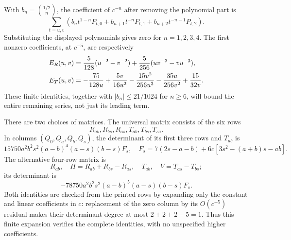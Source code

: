 \documentclass[12pt]{article}
\numberwithin{equation}{section}
\begin{document}
With $b_n=\binom{1/2}{n}$, the coefficient of $c^{-n}$ after removing
the polynomial part is
\begin{equation}\label{eq:ff-pcancel}
 \sum_{t=u,v}\left(b_nt^{1-n}P_{t,0}
       +b_{n+1}t^{-n}P_{t,1}+b_{n+2}t^{-n-1}P_{t,2}\right).
\end{equation}
Substituting the displayed polynomials gives zero for $n=1,2,3,4$.
The first nonzero coefficients, at $c^{-5}$, are respectively
\begin{align}
 E_R(u,v)&=\frac5{128}(u^{-2}-v^{-2})
              +\frac5{256}(uv^{-3}-vu^{-3}),\label{eq:ff-leading}\\
 E_T(u,v)&=-\frac{75}{128u}+\frac{5v}{16u^2}
 -\frac{15v^2}{256u^3}-\frac{35u}{256v^2}+\frac{15}{32v}.\notag
\end{align}
These finite identities, together with $|b_n|\le21/1024$ for $n\ge6$,
will bound the entire remaining series, not just its leading term.

There are two choices of matrices. The universal matrix consists of
the six rows
\begin{equation}\label{eq:ff-p0rows}
 R_{ab},R_{bs},R_{as},T_{ab},T_{bs},T_{sa}.
\end{equation}
In columns $(Q_0,Q_a,Q_b,Q_s)$, the determinant of its first three
rows and $T_{ab}$ is
\begin{equation}\label{eq:ff-p0det}
 15750a^2b^2s^2(a-b)^4(a-s)(b-s)F_s,
 \quad F_s=7(2s-a-b)+6c[3s^2-(a+b)s-ab].
\end{equation}
The alternative four-row matrix is
\begin{equation}\label{eq:ff-prows}
 R_{ab},\quad H=R_{ab}+R_{bs}-R_{as},\quad
 T_{ab},\quad V=T_{as}-T_{bs};
\end{equation}
its determinant is
\begin{equation}\label{eq:ff-pdet}
 -78750a^2b^2s^2(a-b)^5(a-s)(b-s)F_s.
\end{equation}
Both identities are checked from the printed rows by expanding only
the constant and linear coefficients in $c$: replacement of the zero
column by its $O(c^{-5})$ residual makes their determinant degree at
most $2+2+2-5=1$. Thus this finite expansion verifies the complete
identities, with no unspecified higher coefficients.
\end{document}
